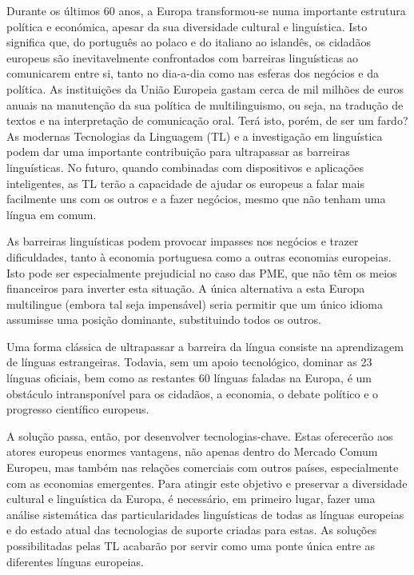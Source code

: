 \documentclass[]{../metanetpaper}
\begin{document}
\begin{multicols}{2}
Durante os últimos 60 anos, a Europa transformou-se numa importante estrutura política e económica, apesar da sua diversidade cultural e linguística. Isto significa que, do português ao polaco e do italiano ao islandês, os cidadãos europeus são inevitavelmente confrontados com barreiras linguísticas ao comunicarem entre si, tanto no dia-a-dia como nas esferas dos negócios e da política. As instituições da União Europeia gastam cerca de mil milhões de euros anuais na manutenção da sua política de multilinguismo, ou seja, na tradução de textos e na interpretação de comunicação oral. Terá isto, porém, de ser um fardo? As modernas Tecnologias da Linguagem (TL) e a investigação em linguística podem dar uma importante contribuição para ultrapassar as barreiras linguísticas. No futuro, quando combinadas com dispositivos e aplicações inteligentes, as TL terão a capacidade de ajudar os europeus a falar mais facilmente uns com os outros e a fazer negócios, mesmo que não tenham uma língua em comum.


As barreiras linguísticas podem provocar impasses nos negócios e trazer dificuldades, tanto à economia portuguesa como a outras economias europeias. Isto pode ser especialmente prejudicial no caso das PME, que não têm os meios financeiros para inverter esta situação. A única alternativa a esta Europa multilingue (embora tal seja impensável) seria permitir que um único idioma assumisse uma posição dominante, substituindo todos os outros.

Uma forma clássica de ultrapassar a barreira da língua consiste na aprendizagem de línguas estrangeiras. Todavia, sem um apoio tecnológico, dominar as 23 línguas oficiais, bem como as restantes 60 línguas faladas na Europa, é um obs\-tá\-cu\-lo intransponível para os cidadãos, a economia, o debate político e o progresso científico europeus.

A solução passa, então, por desenvolver tecnologias-chave. Estas oferecerão aos atores europeus enormes vantagens, não apenas dentro do Mercado Comum Europeu, mas também nas relações comerciais com outros países, especialmente com as economias emergentes. Para atingir este objetivo e preservar a diversidade cultural e linguística da Europa, é necessário, em primeiro lugar, fazer uma análise sistemática das particularidades linguísticas de todas as línguas europeias e do estado atual das tecnologias de suporte criadas para estas. As soluções possibilitadas pelas TL acabarão por servir como uma ponte única entre as diferentes línguas europeias.


\end{multicols}
\end{document}
